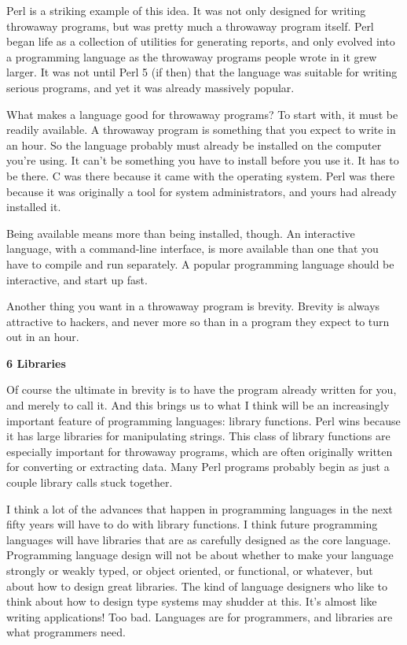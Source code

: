Perl is a striking example of this idea. It was not only designed for
writing throwaway programs, but was pretty much a throwaway program
itself. Perl began life as a collection of utilities for generating
reports, and only evolved into a programming language as the throwaway
programs people wrote in it grew larger. It was not until Perl 5 (if
then) that the language was suitable for writing serious programs, and
yet it was already massively popular.

What makes a language good for throwaway programs? To start with, it
must be readily available. A throwaway program is something that you
expect to write in an hour. So the language probably must already be
installed on the computer you're using. It can't be something you have
to install before you use it. It has to be there. C was there because it
came with the operating system. Perl was there because it was originally
a tool for system administrators, and yours had already installed it.

Being available means more than being installed, though. An interactive
language, with a command-line interface, is more available than one that
you have to compile and run separately. A popular programming language
should be interactive, and start up fast.

Another thing you want in a throwaway program is brevity. Brevity is
always attractive to hackers, and never more so than in a program they
expect to turn out in an hour.

\textbf{6 Libraries}

Of course the ultimate in brevity is to have the program already written
for you, and merely to call it. And this brings us to what I think will
be an increasingly important feature of programming languages: library
functions. Perl wins because it has large libraries for manipulating
strings. This class of library functions are especially important for
throwaway programs, which are often originally written for converting or
extracting data. Many Perl programs probably begin as just a couple
library calls stuck together.

I think a lot of the advances that happen in programming languages in
the next fifty years will have to do with library functions. I think
future programming languages will have libraries that are as carefully
designed as the core language. Programming language design will not be
about whether to make your language strongly or weakly typed, or object
oriented, or functional, or whatever, but about how to design great
libraries. The kind of language designers who like to think about how to
design type systems may shudder at this. It's almost like writing
applications! Too bad. Languages are for programmers, and libraries are
what programmers need.

